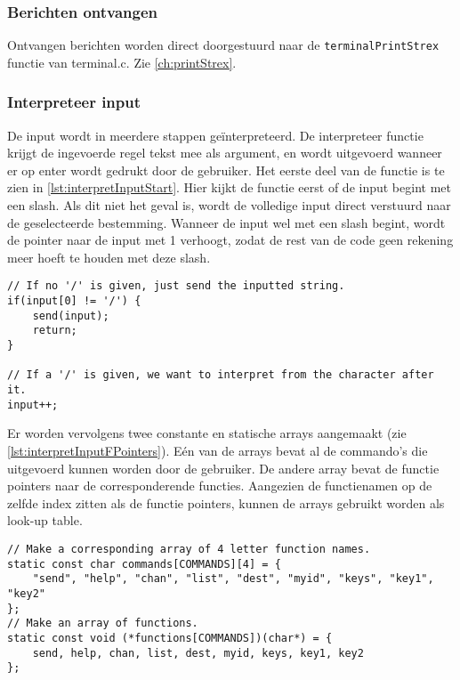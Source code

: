 \subsubsection{Berichten ontvangen} \label{ch:messageReceive}
Ontvangen berichten worden direct doorgestuurd naar de \texttt{terminalPrintStrex} functie van terminal.c. Zie \autoref{ch:printStrex}.

\subsubsection{Interpreteer input} \label{ch:interpreter}

De input wordt in meerdere stappen geïnterpreteerd. De interpreteer functie krijgt de ingevoerde regel tekst mee als argument, en wordt uitgevoerd wanneer er op enter wordt gedrukt door de gebruiker.
Het eerste deel van de functie is te zien in \autoref{lst:interpretInputStart}. Hier kijkt de functie eerst of de input begint met een slash. Als dit niet het geval is, wordt de volledige input direct verstuurd naar de geselecteerde bestemming. Wanneer de input wel met een slash begint, wordt de pointer naar de input met 1 verhoogt, zodat de rest van de code geen rekening meer hoeft te houden met deze slash.

\begin{lstlisting}[caption={Eerste deel van de interpreter},captionpos=b,label={lst:interpretInputStart},style=c,xleftmargin=.\textwidth,xrightmargin=.\textwidth]
// If no '/' is given, just send the inputted string.
if(input[0] != '/') {
    send(input);
    return;
}

// If a '/' is given, we want to interpret from the character after it.
input++;
\end{lstlisting}

Er worden vervolgens twee constante en statische arrays aangemaakt (zie \autoref{lst:interpretInputFPointers}). Eén van de arrays bevat al de commando's die uitgevoerd kunnen worden door de gebruiker. De andere array bevat de functie pointers naar de corresponderende functies.
Aangezien de functienamen op de zelfde index zitten als de functie pointers, kunnen de arrays gebruikt worden als look-up table.

\begin{lstlisting}[caption={De look-up table van de interpreter},captionpos=b,label={lst:interpretInputFPointers},style=c,xleftmargin=.\textwidth,xrightmargin=.\textwidth]
// Make a corresponding array of 4 letter function names.
static const char commands[COMMANDS][4] = {
    "send", "help", "chan", "list", "dest", "myid", "keys", "key1", "key2"
};
// Make an array of functions.
static const void (*functions[COMMANDS])(char*) = {
    send, help, chan, list, dest, myid, keys, key1, key2
};
\end{lstlisting}

